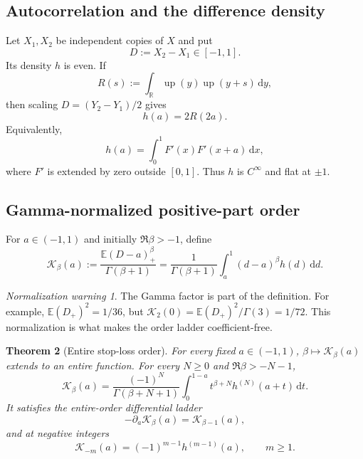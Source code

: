 \documentclass[11pt,oneside]{article}
\newtheorem{theorem}{Theorem}[section]
\theoremstyle{definition}
\theoremstyle{remark}
\newtheorem{warning}[theorem]{Normalization warning}
\newcommand{\R}{\mathbb R}
\newcommand{\E}{\mathbb E}
\newcommand{\Up}{\operatorname{up}}
\newcommand{\dd}{\,\mathrm d}
\newcommand{\Kord}{\mathcal K}
\begin{document}
\subsection{Autocorrelation and the difference density}

Let $X_1,X_2$ be independent copies of $X$ and put
\begin{equation}
 D:=X_2-X_1\in[-1,1].
 \label{eq:D-def}
\end{equation}
Its density $h$ is even.  If
\begin{equation}
 R(s):=\int_{\R}\Up(y)\Up(y+s)\dd y,
 \label{eq:up-autocorrelation}
\end{equation}
then scaling $D=(Y_2-Y_1)/2$ gives
\begin{equation}
 h(a)=2R(2a).
 \label{eq:h-R-relation}
\end{equation}
Equivalently,
\begin{equation}
 h(a)=\int_0^1F'(x)F'(x+a)\dd x,
 \label{eq:h-F-density-correlation}
\end{equation}
where $F'$ is extended by zero outside $[0,1]$.  Thus $h$ is $C^\infty$ and
flat at $\pm1$.

\subsection{Gamma-normalized positive-part order}

For $a\in(-1,1)$ and initially $\Re\beta>-1$, define
\begin{equation}
 \Kord_\beta(a)
 :=\frac{\E(D-a)_+^\beta}{\Gamma(\beta+1)}
 =\frac1{\Gamma(\beta+1)}
  \int_a^1(d-a)^\beta h(d)\dd d.
 \label{eq:K-beta-def}
\end{equation}

\begin{warning}
The Gamma factor is part of the definition.  For example,
$\E(D_+)^2=1/36$, but
$\Kord_2(0)=\E(D_+)^2/\Gamma(3)=1/72$.  This normalization is what makes the
order ladder coefficient-free.
\end{warning}

\begin{theorem}[Entire stop-loss order]
\label{thm:K-entire}
For every fixed $a\in(-1,1)$, $\beta\mapsto\Kord_\beta(a)$ extends to an
entire function.  For every $N\ge0$ and $\Re\beta>-N-1$,
\begin{equation}
 \Kord_\beta(a)
 =\frac{(-1)^N}{\Gamma(\beta+N+1)}
  \int_0^{1-a}t^{\beta+N}h^{(N)}(a+t)\dd t.
 \label{eq:K-entire-continuation}
\end{equation}
It satisfies the entire-order differential ladder
\begin{equation}
 -\partial_a\Kord_\beta(a)=\Kord_{\beta-1}(a),
 \label{eq:K-order-ladder}
\end{equation}
and at negative integers
\begin{equation}
 \Kord_{-m}(a)=(-1)^{m-1}h^{(m-1)}(a),
 \qquad m\ge1.
 \label{eq:K-negative-orders}
\end{equation}
\end{theorem}
\end{document}
